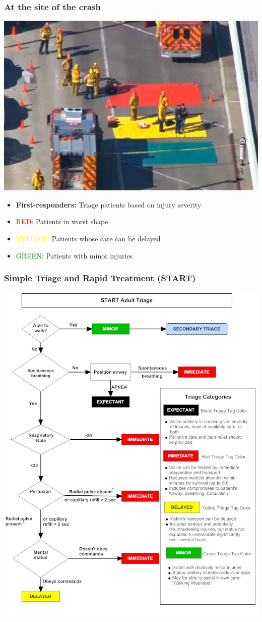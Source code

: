 \documentclass{beamer}
\begin{document}
\begin{frame}
  \frametitle{At the site of the crash}
  \begin{minipage}[c]{.45\textwidth}
    \includegraphics[width=1\textwidth]{EMSTriage}
  \end{minipage}
  \begin{minipage}[c]{.45\textwidth}
    \begin{itemize}
      \item \textbf{First-responders:} Triage patients based on injury severity
      \item \textcolor{red}{RED:} Patients in worst shape
      \item \textcolor{yellow}{YELLOW:} Patients whose care can be delayed
      \item \textcolor{green}{GREEN:} Patients with minor injuries
    \end{itemize}
  \end{minipage}
\end{frame}

\begin{frame}
  \frametitle{Simple Triage and Rapid Treatment (START)}
  \centering
  \includegraphics[width=.5\textwidth]{StartAdultTriageAlgorithm}
\end{frame}
\end{document}
